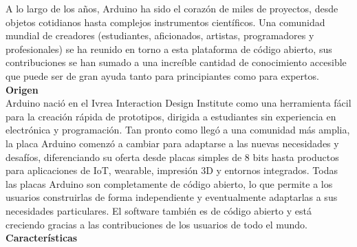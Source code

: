 \documentclass[12pt]{article}
\begin{document}
	\noindent A lo largo de los años, Arduino ha sido el corazón de miles de proyectos, desde objetos cotidianos hasta complejos instrumentos científicos. Una comunidad mundial de creadores (estudiantes, aficionados, artistas, programadores y profesionales) se ha reunido en torno a esta plataforma de código abierto, sus contribuciones se han sumado a una increíble cantidad de conocimiento accesible que puede ser de gran ayuda tanto para principiantes como para expertos. \\
	
	\noindent  \textbf{\large Origen} \\ 
	
	\noindent Arduino nació en el Ivrea Interaction Design Institute como una herramienta fácil para la creación rápida de prototipos, dirigida a estudiantes sin experiencia en electrónica y programación. Tan pronto como llegó a una comunidad más amplia, la placa Arduino comenzó a cambiar para adaptarse a las nuevas necesidades y desafíos, diferenciando su oferta desde placas simples de 8 bits hasta productos para aplicaciones de IoT, wearable, impresión 3D y entornos integrados. Todas las placas Arduino son completamente de código abierto, lo que permite a los usuarios construirlas de forma independiente y eventualmente adaptarlas a sus necesidades particulares. El software también es de código abierto y está creciendo gracias a las contribuciones de los usuarios de todo el mundo. \\

	
	\noindent \textbf{\large Características} \\
	
\end{document}

